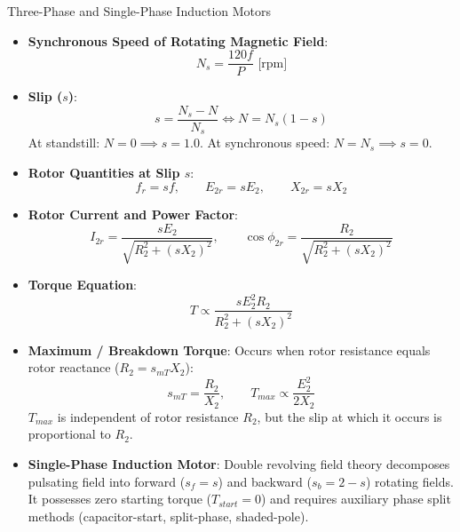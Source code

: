 \begin{formulabox}{Three-Phase and Single-Phase Induction Motors}
\begin{itemize}[leftmargin=1.5em]
    \item \textbf{Synchronous Speed of Rotating Magnetic Field}:
    \[ N_s = \frac{120 f}{P} \text{ [rpm]} \]
    \item \textbf{Slip ($s$)}:
    \[ s = \frac{N_s - N}{N_s} \iff N = N_s(1 - s) \]
    At standstill: $N = 0 \implies s = 1.0$. At synchronous speed: $N = N_s \implies s = 0$.
    \item \textbf{Rotor Quantities at Slip $s$}:
    \[ f_r = s f, \qquad E_{2r} = s E_2, \qquad X_{2r} = s X_2 \]
    \item \textbf{Rotor Current and Power Factor}:
    \[ I_{2r} = \frac{s E_2}{\sqrt{R_2^2 + (s X_2)^2}}, \qquad \cos\phi_{2r} = \frac{R_2}{\sqrt{R_2^2 + (s X_2)^2}} \]
    \item \textbf{Torque Equation}:
    \[ T \propto \frac{s E_2^2 R_2}{R_2^2 + (s X_2)^2} \]
    \item \textbf{Maximum / Breakdown Torque}:
    Occurs when rotor resistance equals rotor reactance ($R_2 = s_{mT} X_2$):
    \[ s_{mT} = \frac{R_2}{X_2}, \qquad T_{max} \propto \frac{E_2^2}{2 X_2} \]
    $T_{max}$ is independent of rotor resistance $R_2$, but the slip at which it occurs is proportional to $R_2$.
    \item \textbf{Single-Phase Induction Motor}:
    Double revolving field theory decomposes pulsating field into forward ($s_f = s$) and backward ($s_b = 2 - s$) rotating fields. It possesses zero starting torque ($T_{start} = 0$) and requires auxiliary phase split methods (capacitor-start, split-phase, shaded-pole).
\end{itemize}
\end{formulabox}

